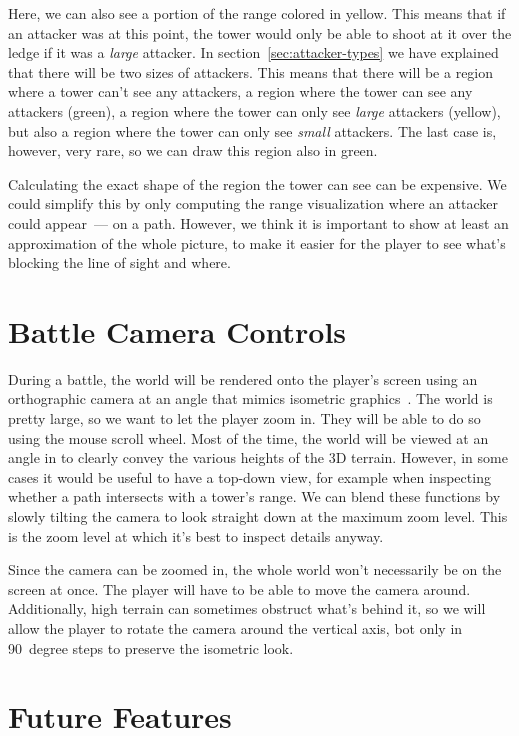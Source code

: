 Here, we can also see a portion of the range colored in yellow.
This means that if an attacker was at this point, the tower would only be able to shoot at it over the ledge if it was a \emph{large} attacker.
In section~\ref{sec:attacker-types} we have explained that there will be two sizes of attackers.
This means that there will be a region where a tower can't see any attackers, a region where the tower can see any attackers (green), a region where the tower can only see \emph{large} attackers (yellow), but also a region where the tower can only see \emph{small} attackers.
The last case is, however, very rare, so we can draw this region also in green.

Calculating the exact shape of the region the tower can see can be expensive.
We could simplify this by only computing the range visualization where an attacker could appear~--- on a path.
However, we think it is important to show at least an approximation of the whole picture, to make it easier for the player to see what's blocking the line of sight and where.

\section{Battle Camera Controls}

During a battle, the world will be rendered onto the player's screen using an orthographic camera at an angle that mimics isometric graphics~\cite{IsometricWiki}.
The world is pretty large, so we want to let the player zoom in.
They will be able to do so using the mouse scroll wheel.
Most of the time, the world will be viewed at an angle in to clearly convey the various heights of the 3D terrain.
However, in some cases it would be useful to have a top-down view, for example when inspecting whether a path intersects with a tower's range.
We can blend these functions by slowly tilting the camera to look straight down at the maximum zoom level.
This is the zoom level at which it's best to inspect details anyway.

Since the camera can be zoomed in, the whole world won't necessarily be on the screen at once.
The player will have to be able to move the camera around.
Additionally, high terrain can sometimes obstruct what's behind it, so we will allow the player to rotate the camera around the vertical axis, bot only in 90~degree steps to preserve the isometric look.

\section{Future Features}

